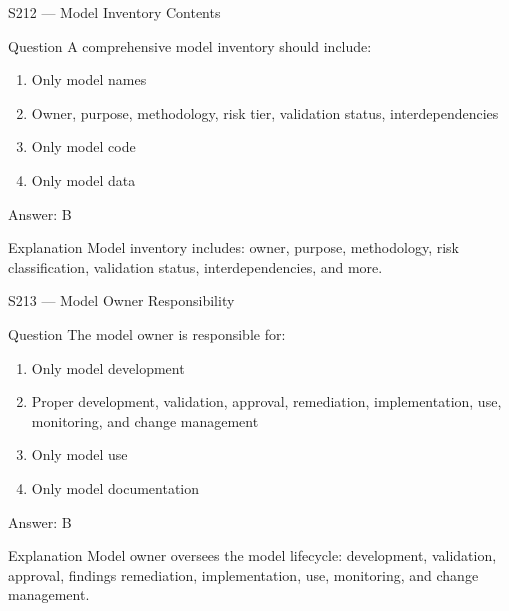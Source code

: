 \documentclass[aspectratio=169,8pt]{beamer}
\begin{document}
\begin{frame}{S212 --- Model Inventory Contents}
	\begin{block}{Question}
		A comprehensive model inventory should include:
		\begin{enumerate}
			\item Only model names
			\item Owner, purpose, methodology, risk tier, validation status, interdependencies
			\item Only model code
			\item Only model data
		\end{enumerate}
	\end{block}
	\begin{exampleblock}{Answer: B}\end{exampleblock}
	\begin{block}{Explanation}
		Model inventory includes: owner, purpose, methodology, risk classification, validation status, interdependencies, and more.
	\end{block}
\end{frame}

\begin{frame}{S213 --- Model Owner Responsibility}
	\begin{block}{Question}
		The model owner is responsible for:
		\begin{enumerate}
			\item Only model development
			\item Proper development, validation, approval, remediation, implementation, use, monitoring, and change management
			\item Only model use
			\item Only model documentation
		\end{enumerate}
	\end{block}
	\begin{exampleblock}{Answer: B}\end{exampleblock}
	\begin{block}{Explanation}
		Model owner oversees the model lifecycle: development, validation, approval, findings remediation, implementation, use, monitoring, and change management.
	\end{block}
\end{frame}
\end{document}

